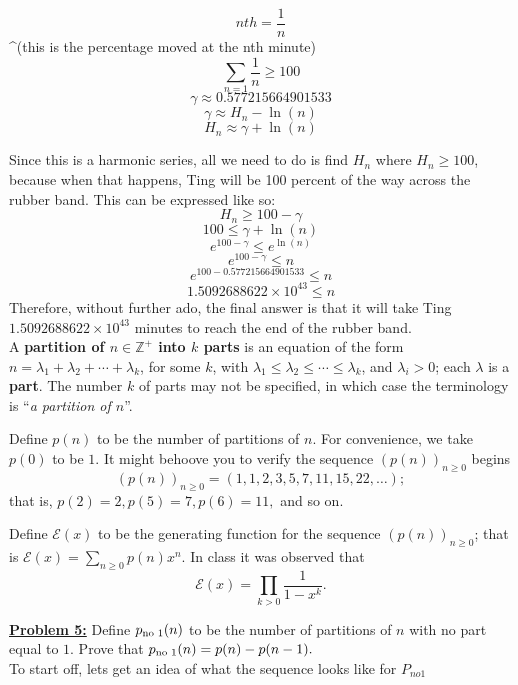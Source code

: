 \documentclass[10pt, AMS Euler]{article}
\newcommand{\ds}{\displaystyle}
\newcommand{\Z}{\mathbb{Z}}
\begin{document}
$$nth = \frac{1}{n}$$ \textasciicircum(this is the percentage moved at the nth minute)
$$\sum_{n=1} \frac{1}{n} \geq 100$$
$$\gamma \approx 0.577215664901533$$
$$\gamma \approx H_n - \ln(n)$$
$$H_n \approx \gamma + \ln(n)$$

Since this is a harmonic series, all we need to do is find $H_n$ where $H_n \geq 100$, because when that happens, Ting will be 100 percent of the way across the rubber band. This can be expressed like so:\\

$$H_n \geq 100 - \gamma$$
$$100 \leq \gamma + \ln(n)$$
$$e^{100 - \gamma} \leq e^{\ln(n)}$$
$$e^{100 - \gamma} \leq n$$
$$e^{100 - 0.577215664901533} \leq n$$
$$1.5092688622 \times 10^{43} \leq n$$
Therefore, without further ado, the final answer is that it will take Ting $1.5092688622 \times 10^{43}$ minutes to reach the end of the rubber band. \\
 
	
	 A {\bf partition of $n \in \Z^+$ into $k$ parts} is an equation of the form $n=\lambda_1 + \lambda_2 + \cdots + \lambda_k$, for some $k$, with $\lambda_1 \leq \lambda_2 \leq \cdots \leq \lambda_k$, and $\lambda_i >0$; each $\lambda$ is a {\bf part}.  The number $k$ of parts may not be specified, in which case the terminology is ``\emph{a partition of $n$}''. 
	
	Define $p(n)$ to be the number of partitions of $n$.  
	For convenience, we take $p(0)$ to be $1$. 
	It might behoove you to verify the sequence $\left(p(n)\right)_{n \geq 0}$ begins 
	$$\left( p(n)\right)_{n \geq 0} = (1,1,2,3,5,7,11,15,22, \dots);$$
	that is, $p(2) = 2, p(5) = 7, p(6)=11,$ and so on. 
	
	Define $\mathcal{E}(x)$ to be the generating function for the sequence $\left(p(n)\right)_{n \geq 0}$; that is 
	$\ds \mathcal{E}(x) = \sum_{n \geq 0}p(n)x^n$. 
	In class it was observed that $$\mathcal{E}(x) = \prod_{k > 0} \frac{1}{1-x^k}.$$
	
	\noindent \underline{{\bf Problem 5:}}  Define $p_{\mbox{\scriptsize no } 1}(n)$ to be the number of partitions of $n$ with no part equal to $1$.  Prove that $p_{\mbox{\scriptsize no }1}(n) = p(n) - p(n-1).$\\
 
To start off, lets get an idea of what the sequence looks like for $P_{no 1}$\\
\end{document}
